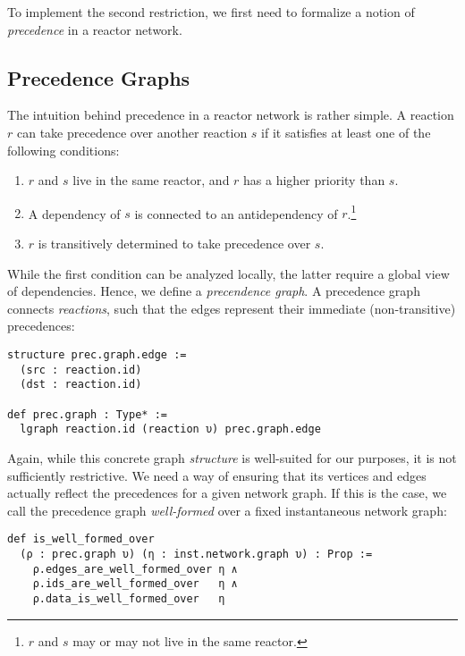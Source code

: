 \noindent To implement the second restriction, we first need to formalize a notion of \emph{precedence} in a reactor network.

\break

\subsection{Precedence Graphs}

The intuition behind precedence in a reactor network is rather simple. 
A reaction $r$ can take precedence over another reaction $s$ if it satisfies at least one of the following conditions:

\begin{enumerate}
  \item $r$ and $s$ live in the same reactor, and $r$ has a higher priority than $s$.
  \item A dependency of $s$ is connected to an antidependency of $r$.\footnote{
    $r$ and $s$ may or may not live in the same reactor.
  }
  \item $r$ is transitively determined to take precedence over $s$. 
\end{enumerate}

\noindent While the first condition can be analyzed locally, the latter require a global view of dependencies.
Hence, we define a \emph{precendence graph}.
A precedence graph connects \emph{reactions}, such that the edges represent their immediate (non-transitive) precedences:

\begin{lstlisting}
structure prec.graph.edge := 
  (src : reaction.id)
  (dst : reaction.id)

def prec.graph : Type* := 
  lgraph reaction.id (reaction υ) prec.graph.edge
\end{lstlisting}

\noindent Again, while this concrete graph \emph{structure} is well-suited for our purposes, it is not sufficiently restrictive.
We need a way of ensuring that its vertices and edges actually reflect the precedences for a given network graph.
If this is the case, we call the precedence graph \emph{well-formed} over a fixed instantaneous network graph:

\lstset{numbers=left, xleftmargin=1.5em}
\begin{lstlisting}
def is_well_formed_over 
  (ρ : prec.graph υ) (η : inst.network.graph υ) : Prop :=
    ρ.edges_are_well_formed_over η ∧
    ρ.ids_are_well_formed_over   η ∧ 
    ρ.data_is_well_formed_over   η  
\end{lstlisting}

